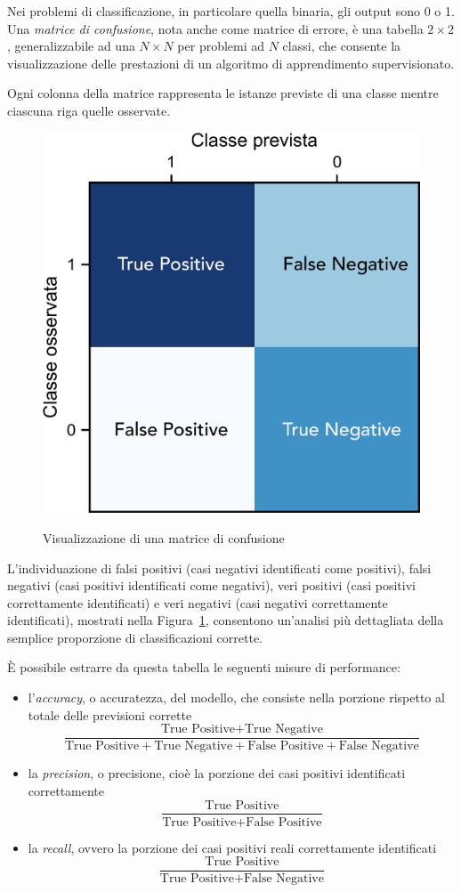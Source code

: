 Nei problemi di classificazione, in particolare quella binaria, gli output sono 0 o 1. \\
Una \emph{matrice di confusione}, nota anche come matrice di errore, è una tabella $2 \times 2$, generalizzabile ad una $N \times N$ per problemi ad $N$ classi, che consente la visualizzazione delle prestazioni di un algoritmo di apprendimento supervisionato. 

Ogni colonna della matrice rappresenta le istanze previste di una classe mentre ciascuna riga quelle osservate. 

\begin{figure}[t]
	\centering
	{\includegraphics[width=.3\textwidth]{images/confmatrix}}
	\caption{Visualizzazione di una matrice di confusione}
	\label{fig:confmat}
\end{figure}

L'individuazione di falsi positivi (casi negativi identificati come positivi), falsi negativi (casi positivi identificati come negativi), veri positivi (casi positivi correttamente identificati) e veri negativi (casi negativi correttamente identificati), mostrati nella Figura~\ref{fig:confmat}, consentono  un'analisi più dettagliata della semplice proporzione di classificazioni corrette.

È possibile estrarre da questa tabella le seguenti misure di performance:
\begin{itemize}
	\item l'\emph{accuracy}, o accuratezza, del modello, che consiste nella porzione rispetto al totale delle previsioni corrette
	\begin{equation}
		\frac{\mbox{True Positive} + \mbox{True Negative}}{\mbox{True Positive} + \mbox{True Negative} + \mbox{False Positive} + \mbox{False Negative}}
	\end{equation} 
	\item la \emph{precision}, o precisione, cioè la porzione dei casi positivi identificati correttamente
		\begin{equation}
	\frac{\mbox{True Positive}}{\mbox{True Positive} + \mbox{False Positive}}
	\end{equation}
	
	\item la \emph{recall}, ovvero la porzione dei casi positivi reali correttamente identificati
		\begin{equation}
	\frac{\mbox{True Positive}}{\mbox{True Positive} + \mbox{False Negative}}
	\end{equation}
\end{itemize}


